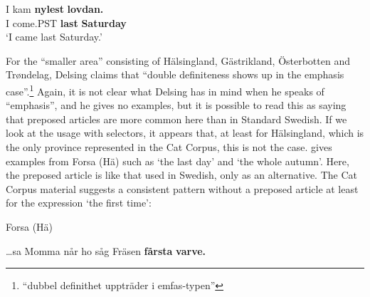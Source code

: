 

 \ea\label{}
\gll I  kam  \textbf{nylest} \textbf{lovdan.}\\


I  come.PST  \textbf{last} \textbf{Saturday}\\

\glt ‘I came last Saturday.’

\z

For the “smaller area” consisting of Hälsingland, Gästrikland, Österbotten and Trøndelag, Delsing claims that “double definiteness shows up in the emphasis case”.\footnote{ “dubbel definithet uppträder i emfas-typen” } Again, it is not clear what Delsing has in mind when he speaks of “emphasis”, and he gives no examples, but it is possible to read this as saying that preposed articles are more common here than in Standard Swedish. If we look at the usage with selectors, it appears that, at least for Hälsingland, which is the only province represented in the Cat Corpus, this is not the case. \citet[31]{Franck1995} gives examples from Forsa (Hä) such as  ‘the last day’ and  ‘the whole autumn’.  Here, the preposed article is like that used in Swedish, only as an alternative. The Cat Corpus material suggests a consistent pattern without a preposed article at least for the expression ‘the first time’:


\item 


\item 

Forsa (Hä)



 \ea\label{}
\gll …sa  Momma  når  ho  såg  Fräsen  \textbf{fårsta} \textbf{varve.}\\


